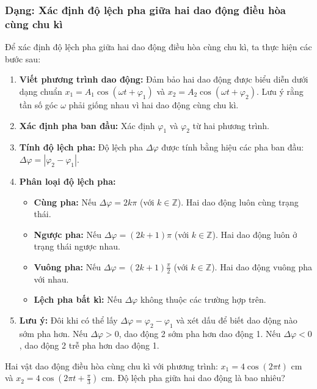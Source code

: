 \subsubsection{Dạng: Xác định độ lệch pha giữa hai dao động điều hòa cùng chu kì}
\begin{phuongphap}
Để xác định độ lệch pha giữa hai dao động điều hòa cùng chu kì, ta thực hiện các bước sau:
\begin{enumerate}
    \item \textbf{Viết phương trình dao động:} Đảm bảo hai dao động được biểu diễn dưới dạng chuẩn $x_1 = A_1\cos(\omega t + \varphi_1)$ và $x_2 = A_2\cos(\omega t + \varphi_2)$. Lưu ý rằng tần số góc $\omega$ phải giống nhau vì hai dao động cùng chu kì.
    \item \textbf{Xác định pha ban đầu:} Xác định $\varphi_1$ và $\varphi_2$ từ hai phương trình.
    \item \textbf{Tính độ lệch pha:} Độ lệch pha $\Delta\varphi$ được tính bằng hiệu các pha ban đầu: $\Delta\varphi = |\varphi_2 - \varphi_1|$.
    \item \textbf{Phân loại độ lệch pha:}
    \begin{itemize}
        \item \textbf{Cùng pha:} Nếu $\Delta\varphi = 2k\pi$ (với $k \in \mathbb{Z}$). Hai dao động luôn cùng trạng thái.
        \item \textbf{Ngược pha:} Nếu $\Delta\varphi = (2k+1)\pi$ (với $k \in \mathbb{Z}$). Hai dao động luôn ở trạng thái ngược nhau.
        \item \textbf{Vuông pha:} Nếu $\Delta\varphi = (2k+1)\frac{\pi}{2}$ (với $k \in \mathbb{Z}$). Hai dao động vuông pha với nhau.
        \item \textbf{Lệch pha bất kì:} Nếu $\Delta\varphi$ không thuộc các trường hợp trên.
    \end{itemize}
    \item \textbf{Lưu ý:} Đôi khi có thể lấy $\Delta\varphi = \varphi_2 - \varphi_1$ và xét dấu để biết dao động nào sớm pha hơn. Nếu $\Delta\varphi > 0$, dao động 2 sớm pha hơn dao động 1. Nếu $\Delta\varphi < 0$, dao động 2 trễ pha hơn dao động 1.
\end{enumerate}
\end{phuongphap}
\begin{vidumau}
Hai vật dao động điều hòa cùng chu kì với phương trình: $x_1 = 4\cos(2\pi t)$ cm và $x_2 = 4\cos(2\pi t + \frac{\pi}{3})$ cm. Độ lệch pha giữa hai dao động là bao nhiêu?
\end{vidumau}

